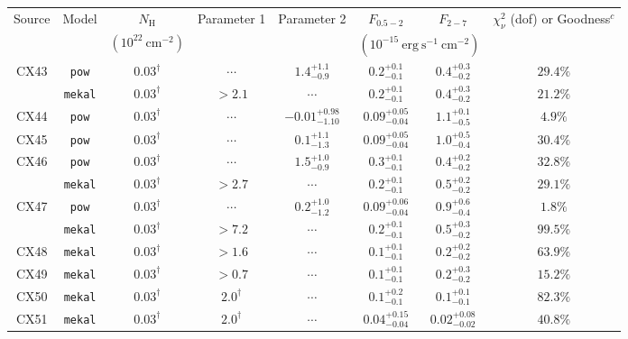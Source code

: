 \documentclass[fleqn,usenatbib]{mnras}
\newcommand\nodata{ ~$\cdots$~ }%
\newcommand{\nd}{\nodata}
\begin{document}
\begin{table*}
    \centering
    \renewcommand{\arraystretch}{1.2}
    \begin{tabular}{cccccccc}
    \hline
       Source  & Model & $N_\mathrm{H}$ & Parameter 1 & Parameter 2 & $F_{0.5-2}$ & $F_{2-7}$ &  $\chi_\nu^2$ (dof) or Goodness$^c$\\
               &       & $(10^{22}~\mathrm{cm^{-2}})$ & & & \multicolumn{2}{c}{$(10^{-15}~\mathrm{erg~s^{-1}~cm^{-2}})$} & \\
    \hline
    \multirow{2}{*}{CX43} & {\tt pow}   & $0.03^\dag$ & \nd & $1.4^{+1.1}_{-0.9}$ & $0.2^{+0.1}_{-0.1}$ & $0.4^{+0.3}_{-0.2}$ & $29.4\%$ \\
                          & {\tt mekal} & $0.03^\dag$ & $>2.1$ & \nd & $0.2^{+0.1}_{-0.1}$ & $0.4^{+0.3}_{-0.2}$ & $21.2\%$ \\
    \hline
     CX44   & {\tt pow}  & $0.03^\dag$ & \nd & $-0.01^{+0.98}_{-1.10}$ & $0.09^{+0.05}_{-0.04}$ & $1.1^{+0.1}_{-0.5}$ & $4.9\%$ \\
     CX45   & {\tt pow}  & $0.03^\dag$ & \nd & $0.1^{+1.1}_{-1.3}$ & $0.09^{+0.05}_{-0.04}$ & $1.0^{+0.5}_{-0.4}$ & $30.4\%$ \\
    \hline
    \multirow{2}{*}{CX46} & {\tt pow}   & $0.03^\dag$ & \nd & $1.5^{+1.0}_{-0.9}$ & $0.3^{+0.1}_{-0.1}$ & $0.4^{+0.2}_{-0.2}$ & $32.8\%$ \\
                          & {\tt mekal} & $0.03^\dag$ & $>2.7$ & \nd & $0.2^{+0.1}_{-0.1}$ & $0.5^{+0.2}_{-0.2}$ & $29.1\%$ \\
    \hline
    \multirow{2}{*}{CX47} & {\tt pow}  & $0.03^\dag$  & \nd & $0.2^{+1.0}_{-1.2}$ & $0.09^{+0.06}_{-0.04}$ & $0.9^{+0.6}_{-0.4}$ & $1.8\%$ \\
                          & {\tt mekal} & $0.03^\dag$ & $>7.2$ & \nd & $0.2^{+0.1}_{-0.1}$ & $0.5^{+0.3}_{-0.2}$ & $99.5\%$ \\
    \hline
     CX48   & {\tt mekal} & $0.03^\dag$ & $>1.6$ & \nd & $0.1^{+0.1}_{-0.1}$ & $0.2^{+0.2}_{-0.2}$ & $63.9\%$ \\
     CX49   & {\tt mekal} & $0.03^\dag$ & $>0.7$ & \nd & $0.1^{+0.1}_{-0.1}$ & $0.2^{+0.3}_{-0.2}$ & $15.2\%$ \\
     CX50   & {\tt mekal}   & $0.03^\dag$ & $2.0^\dag$ & \nd & $0.1^{+0.2}_{-0.1}$ & $0.1^{+0.1}_{-0.1}$ & $82.3\%$ \\
     CX51   & {\tt mekal}   & $0.03^\dag$ & $2.0^\dag$ & \nd & $0.04^{+0.15}_{-0.04}$ & $0.02^{+0.08}_{-0.02}$ & $40.8\%$ \\

\end{tabular}
\end{table*}
\end{document}
